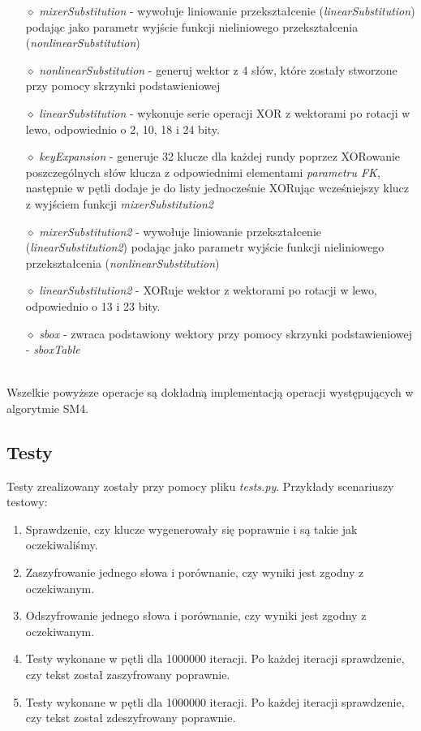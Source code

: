 \begin{itemize}
\begin{itemize}
        \item [$\diamond$] \textit{mixerSubstitution} - wywołuje liniowanie przekształcenie (\textit{linearSubstitution}) podając jako parametr wyjście funkcji nieliniowego przekształcenia (\textit{nonlinearSubstitution})
        \item [$\diamond$] \textit{nonlinearSubstitution} - generuj wektor z 4 słów, które zostały stworzone przy pomocy skrzynki podstawieniowej
        \item [$\diamond$] \textit{linearSubstitution} - wykonuje serie operacji XOR z wektorami po rotacji w lewo, odpowiednio o 2, 10, 18 i 24 bity.
        \item [$\diamond$] \textit{keyExpansion} - generuje 32 klucze dla każdej rundy poprzez XORowanie poszczególnych słów klucza z odpowiednimi elementami \textit{parametru FK}, następnie w pętli dodaje je do listy jednocześnie XORując wcześniejszy klucz z wyjściem funkcji \textit{mixerSubstitution2}
        \item [$\diamond$] \textit{mixerSubstitution2} - wywołuje liniowanie przekształcenie (\textit{linearSubstitution2}) podając jako parametr wyjście funkcji nieliniowego przekształcenia (\textit{nonlinearSubstitution})
        \item [$\diamond$] \textit{linearSubstitution2} - XORuje wektor z wektorami po rotacji w lewo, odpowiednio o 13 i 23 bity.
        \item [$\diamond$] \textit{sbox} - zwraca podstawiony wektory przy pomocy skrzynki podstawieniowej - \textit{sboxTable}
    \end{itemize}
\end{itemize}\\

Wszelkie powyższe operacje są dokładną implementacją operacji występujących w algorytmie SM4.


\subsection{ Testy  }

Testy zrealizowany zostały przy pomocy pliku \textit{tests.py}. Przykłady scenariuszy testowy:\\
\begin{enumerate}
    \item Sprawdzenie, czy klucze wygenerowały się poprawnie i są takie jak oczekiwaliśmy. \\
    \item Zaszyfrowanie jednego słowa i porównanie, czy wyniki jest zgodny z oczekiwanym.\\
    \item Odszyfrowanie jednego słowa i porównanie, czy wyniki jest zgodny z oczekiwanym.\\
    \item Testy wykonane w pętli dla 1000000 iteracji. Po każdej iteracji sprawdzenie, czy tekst został zaszyfrowany poprawnie.
    \item Testy wykonane w pętli dla 1000000 iteracji. Po każdej iteracji sprawdzenie, czy tekst został zdeszyfrowany poprawnie.\\
\end{enumerate}


